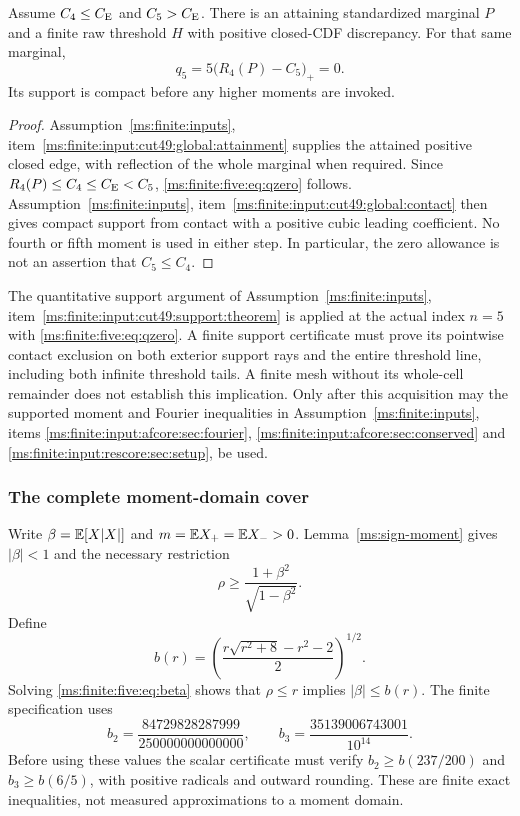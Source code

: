 \begin{lemma}\label{ms:finite:five:lem:qzero}
Assume $C_4\le C_{\mathrm E}$ and $C_5>C_{\mathrm E}$. There is an attaining standardized
marginal $P$ and a finite raw threshold $H$ with positive closed-CDF
discrepancy. For that same marginal,
\begin{equation}\label{ms:finite:five:eq:qzero}
 q_5=5\bigl(R_4(P)-C_5\bigr)_+=0.
\end{equation}
Its support is compact before any higher moments are invoked.
\end{lemma}
\begin{proof}
Assumption~\ref{ms:finite:inputs}, item~\ref{ms:finite:input:cut49:global:attainment} supplies the attained positive closed
edge, with reflection of the whole marginal when required. Since
$R_4(P)\le C_4\le C_{\mathrm E}<C_5$, \eqref{ms:finite:five:eq:qzero} follows.
Assumption~\ref{ms:finite:inputs}, item~\ref{ms:finite:input:cut49:global:contact} then gives compact support from contact
with a positive cubic leading coefficient. No fourth or fifth moment is
used in either step. In particular, the zero allowance is not an
assertion that $C_5\le C_4$.
\end{proof}

The quantitative support argument of
Assumption~\ref{ms:finite:inputs}, item~\ref{ms:finite:input:cut49:support:theorem} is applied at the actual index $n=5$
with \eqref{ms:finite:five:eq:qzero}. A finite support certificate must prove its
pointwise contact exclusion on both exterior support rays and the entire
threshold line, including both infinite threshold tails. A finite mesh
without its whole-cell remainder does not establish this implication.
Only after this acquisition may the supported moment and Fourier
inequalities in Assumption~\ref{ms:finite:inputs}, items
\ref{ms:finite:input:afcore:sec:fourier},
\ref{ms:finite:input:afcore:sec:conserved} and
\ref{ms:finite:input:rescore:sec:setup}, be used.

\subsubsection{The complete moment-domain cover}\label{ms:finite:five:sec:cover}

Write $\beta=\mathbb E[X|X|]$ and $m=\mathbb E X_+=\mathbb E X_->0$.
Lemma~\ref{ms:sign-moment} gives $|\beta|<1$ and the necessary restriction
\begin{equation}\label{ms:finite:five:eq:beta}
 \rho\ge\frac{1+\beta^2}{\sqrt{1-\beta^2}}.
\end{equation}
Define
\[
 b(r)=\left(\frac{r\sqrt{r^2+8}-r^2-2}{2}\right)^{1/2}.
\]
Solving \eqref{ms:finite:five:eq:beta} shows that $\rho\le r$ implies
$|\beta|\le b(r)$. The finite specification uses
\begin{equation}\label{ms:finite:five:eq:benclosures}
 b_2=\frac{84729828287999}{250000000000000},\qquad
 b_3=\frac{35139006743001}{10^{14}}.
\end{equation}
Before using these values the scalar certificate must verify
$b_2\ge b(237/200)$ and $b_3\ge b(6/5)$, with positive radicals
and outward rounding. These are finite exact inequalities, not measured
approximations to a moment domain.

